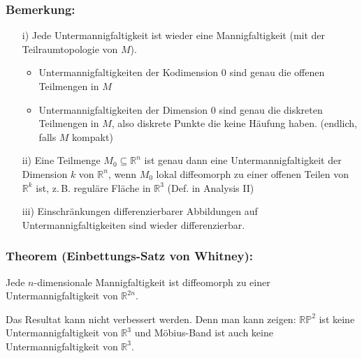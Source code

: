 \documentclass[fleqn, 12pt, letterpaper]{article}
\begin{document}
\subsubsection*{Bemerkung:}
\begin{itemize}
  \item[i)] Jede Untermannigfaltigkeit ist wieder eine Mannigfaltigkeit (mit der Teilraumtopologie von $M$).
  
  \begin{itemize}
    \item Untermannigfaltigkeiten der Kodimension 0 sind genau die offenen Teilmengen in $M$
    \item Untermannigfaltigkeiten der Dimension 0 sind genau die diskreten Teilmengen in $M$, also diskrete Punkte die keine Häufung haben. (endlich, falls $M$ kompakt)
  \end{itemize}

  \item[ii)] Eine Teilmenge $M_0 \subseteq \mathbb{R}^n$ ist genau dann eine Untermannigfaltigkeit der Dimension $k$ von $\mathbb{R}^n$, wenn $M_0$ lokal diffeomorph zu einer offenen Teilen von $\mathbb{R}^k$ ist, z.\,B. reguläre Fläche in $\mathbb{R}^3$ (Def. in Analysis II)

  \item[iii)] Einschränkungen differenzierbarer Abbildungen auf Untermannigfaltigkeiten sind wieder differenzierbar.
\end{itemize}

\subsubsection*{Theorem (Einbettungs-Satz von Whitney):}
Jede $n$-dimensionale Mannigfaltigkeit ist diffeomorph zu einer Untermannigfaltigkeit von $\mathbb{R}^{2n}$.

Das Resultat kann nicht verbessert werden. Denn man kann zeigen: $\mathbb{RP}^2$ ist keine Untermannigfaltigkeit von $\mathbb{R}^3$ und Möbius-Band ist auch keine Untermannigfaltigkeit von $\mathbb{R}^3$.

\vspace{1em}
\end{document}
